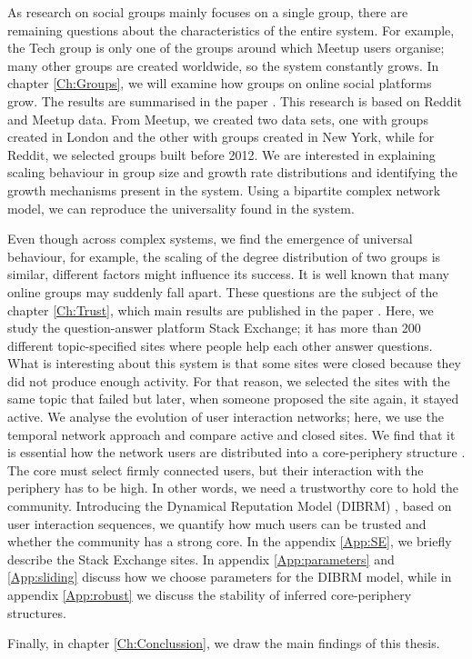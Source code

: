 As research on social groups mainly focuses on a single group, there are remaining questions about the characteristics of the entire system. For example, the Tech group is only one of the groups around which Meetup users organise; many other groups are created worldwide, so the system constantly grows. In chapter \ref{Ch:Groups}, we will examine how groups on online social platforms grow. The results are summarised in the paper  \cite{vranic2022universal}. This research is based on Reddit and Meetup data. From Meetup, we created two data sets, one with groups created in London and the other with groups created in New York, while for Reddit, we selected groups built before 2012. We are interested in explaining scaling behaviour in group size and growth rate distributions and identifying the growth mechanisms present in the system. Using a bipartite complex network model, we can reproduce the universality found in the system.

Even though across complex systems, we find the emergence of universal behaviour, for example, the scaling of the degree distribution of two groups is similar, different factors might influence its success. It is well known that many online groups may suddenly fall apart. These questions are the subject of the chapter \ref{Ch:Trust}, which main results are published in the paper \cite{vranic2022sustainability}. Here, we study the question-answer platform Stack Exchange; it has more than 200 different topic-specified sites where people help each other answer questions. What is interesting about this system is that some sites were closed because they did not produce enough activity. For that reason, we selected the sites with the same topic that failed but later, when someone proposed the site again, it stayed active. We analyse the evolution of user interaction networks; here, we use the temporal network approach and compare active and closed sites. We find that it is essential how the network users are distributed into a core-periphery structure \cite{gallagher2020clarified}. The core must select firmly connected users, but their interaction with the periphery has to be high. In other words, we need a trustworthy core to hold the community. Introducing the Dynamical Reputation Model (DIBRM) \cite{melnikov2018toward}, based on user interaction sequences, we quantify how much users can be trusted and whether the community has a strong core. In the appendix \ref{App:SE}, we briefly describe the Stack Exchange sites. In appendix \ref{App:parameters} and \ref{App:sliding} discuss how we choose parameters for the DIBRM model, while in appendix \ref{App:robust} we discuss the stability of inferred core-periphery structures. 

Finally, in chapter \ref{Ch:Conclussion}, we draw the main findings of this thesis. 















